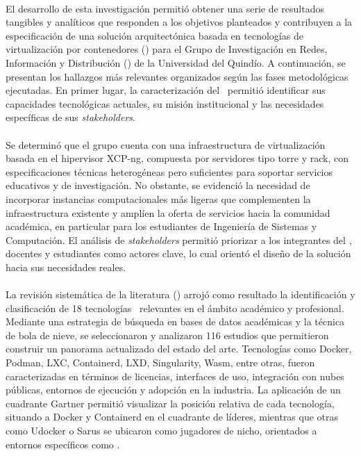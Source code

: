 \label{cap:resultados}
\mbox{}\\
El desarrollo de esta investigación permitió obtener una serie de resultados tangibles y analíticos que responden a los objetivos planteados y contribuyen a la especificación de una solución arquitectónica basada en tecnologías de virtualización por contenedores (\VBC) para el Grupo de Investigación en Redes, Información y Distribución (\GRID) de la Universidad del Quindío. A continuación, se presentan los hallazgos más relevantes organizados según las fases metodológicas ejecutadas. En primer lugar, la caracterización del \GRID\ permitió identificar sus capacidades tecnológicas actuales, su misión institucional y las necesidades específicas de sus \textit{stakeholders}.\\ \\
\noindent
Se determinó que el grupo cuenta con una infraestructura de virtualización basada en el hipervisor XCP-ng, compuesta por servidores tipo torre y rack, con especificaciones técnicas heterogéneas pero suficientes para soportar servicios educativos y de investigación. No obstante, se evidenció la necesidad de incorporar instancias computacionales más ligeras que complementen la infraestructura existente y amplíen la oferta de servicios hacia la comunidad académica, en particular para los estudiantes de Ingeniería de Sistemas y Computación. El análisis de \textit{stakeholders} permitió priorizar a los integrantes del \GRID, docentes y estudiantes como actores clave, lo cual orientó el diseño de la solución hacia sus necesidades reales.  \\ \\
\noindent
La revisión sistemática de la literatura (\SMS) arrojó como resultado la identificación y clasificación de 18 tecnologías \VBC\ relevantes en el ámbito académico y profesional. Mediante una estrategia de búsqueda en bases de datos académicas y la técnica de bola de nieve, se seleccionaron y analizaron 116 estudios que permitieron construir un panorama actualizado del estado del arte. Tecnologías como Docker, Podman, LXC, Containerd, LXD, Singularity, Wasm, entre otras, fueron caracterizadas en términos de licencias, interfaces de uso, integración con nubes públicas, entornos de ejecución y adopción en la industria. La aplicación de un cuadrante Gartner permitió visualizar la posición relativa de cada tecnología, situando a Docker y Containerd en el cuadrante de líderes, mientras que otras como Udocker o Sarus se ubicaron como jugadores de nicho, orientados a entornos específicos como \HPC. \\ \\
